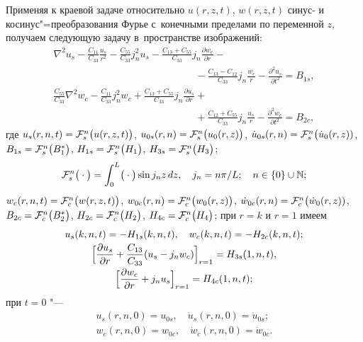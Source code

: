 Применяя к краевой задаче относительно $u(r, z, t)$, $w(r, z, t)$ синус- и косинус"=преобразования Фурье с~конечными 
пределами по переменной $z$,  получаем следующую задачу в~пространстве изображений: 
\begin{equation}
\label{sl:eq25-1}
\begin{array}{l}
\displaystyle
\nabla ^2u_s -
\frac{C_{11} }{C_{33} }\frac{u_s }{r^2}-
\frac{C_{55} }{C_{33} }j_n^2 u_s -
\frac{C_{13} +C_{55} }{C_{33} }j_n \frac{\partial w_c }{\partial r}- \\ \displaystyle\hspace{6cm} -
\frac{C_{13} -C_{12}}{C_{33} }j_n \frac{w_c }{r}-
\frac{\partial ^2u_s }{\partial t^2}=B_{1s}, \\
\displaystyle
\frac{C_{55} }{C_{33} }\nabla ^2w_c -
\frac{C_{11} }{C_{33} }j_n^2 w_c +
\frac{C_{13} +C_{55} }{C_{33} }j_n \frac{\partial u_s }{\partial r}+ \\\displaystyle \hspace{6cm}+
\frac{C_{12} +C_{55} }{C_{33} }j_n \frac{u_s }{r}-
\frac{\partial ^2w_c }{\partial t^2}=B_{2c} ,
\end{array}
\end{equation}
где 
$u_s (r, n, t)= {\cal F}^n_s \bigl(  u(r, z, t) \bigr)$,
$u_{0s} (r, n)= {\cal F}^n_s \bigl(  u_0(r, z) \bigr)$,
$\dot u_{0s} (r, n)= {\cal F}^n_s \bigl(  \dot u_0(r, z) )$,
$B_{1s} =  {\cal F}^n_s \bigl(  B^*_1 \bigr)$,
$H_{1s} =  {\cal F}^n_s \bigl(  H_1 \bigr)$,
$H_{3s} =  {\cal F}^n_s \bigl(  H_3 \bigr)$;
$$  
{\cal F}^n_s\bigl( {}\cdot {} \bigr) =
\int_0^L \bigl( {}\cdot {} \bigr)\sin j_n z\,  dz ,\quad j_n ={n\pi }/{L}; \quad n\in \{0\}\cup \mathbb N;
$$
$w_c (r, n, t)= {\cal F}^n_c \bigl(  w(r, z, t) \bigr)$,
$w_{0c} (r, n)= {\cal F}^n_c \bigl(  w_0(r, z) \bigr)$,
$\dot w_{0c} (r, n)= {\cal F}^n_c \bigl(  \dot w_0(r, z) )$,
$B_{2c} =  {\cal F}^n_c \bigl(  B^*_2 \bigr)$,
$H_{2c} =  {\cal F}^n_c \bigl(  H_2 \bigr)$,
$H_{4c} =  {\cal F}^n_c \bigl(  H_4 \bigr)$;
при $r=k$ и $r= 1$ имеем
\begin{equation}
\label{sl:eq25}
\begin{array}{c}
u_s (k, n, t)=-H_{1s} (k, n, t), \quad w_c (k, n, t)=-H_{2c} (k, n, t); \vspace{1mm} \\
\displaystyle
\Bigl[\frac{\partial u_s }{\partial r}+\frac{C_{13} }{C_{33} }(u_s -j_n w_c ) \Bigr]_{r=1} =H_{3s} (1, n, t), 
 \vspace{1mm} \\
\displaystyle
\Bigr[ \frac{\partial w_c }{\partial r}+j_n u_s  \Bigr]_{r=1} =H_{4c} (1, n, t); 
\end{array}
\end{equation}
при $t=0$ "---
\begin{equation}
\label{sl:eq26}
\begin{array}{c}
u_s (r, n, 0)=u_{0s}, \quad \dot {u}_s (r, n, 0)=\dot {u}_{0s} ; \\ w_c (r, n, 0)=w_{0c} , \quad \dot {w}_c (r, n, 0)=\dot {w}_{0c}.
\end{array}
\end{equation}

